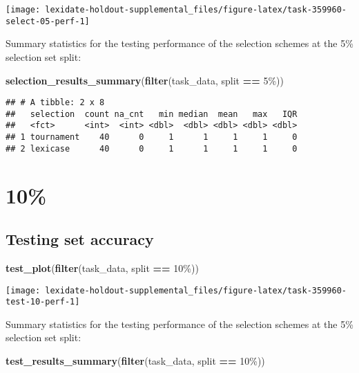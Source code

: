 \documentclass[
]{book}
\newenvironment{Shaded}{\begin{snugshade}}{\end{snugshade}}
\newcommand{\FunctionTok}[1]{\textcolor[rgb]{0.13,0.29,0.53}{\textbf{#1}}}
\newcommand{\NormalTok}[1]{#1}
\newcommand{\SpecialCharTok}[1]{\textcolor[rgb]{0.81,0.36,0.00}{\textbf{#1}}}
\newcommand{\StringTok}[1]{\textcolor[rgb]{0.31,0.60,0.02}{#1}}
\begin{document}
\texttt{[image: lexidate-holdout-supplemental\_files/figure-latex/task-359960-select-05-perf-1]}

Summary statistics for the testing performance of the selection schemes at the 5\% selection set split:

\begin{Shaded}
\begin{Highlighting}[]
\FunctionTok{selection\_results\_summary}\NormalTok{(}\FunctionTok{filter}\NormalTok{(task\_data, split }\SpecialCharTok{==} \StringTok{\textquotesingle{}5\%\textquotesingle{}}\NormalTok{))}
\end{Highlighting}
\end{Shaded}

\begin{verbatim}
## # A tibble: 2 x 8
##   selection  count na_cnt   min median  mean   max   IQR
##   <fct>      <int>  <int> <dbl>  <dbl> <dbl> <dbl> <dbl>
## 1 tournament    40      0     1      1     1     1     0
## 2 lexicase      40      0     1      1     1     1     0
\end{verbatim}

\hypertarget{section-46}{%
\section{10\%}\label{section-46}}

\hypertarget{testing-set-accuracy-46}{%
\subsection{Testing set accuracy}\label{testing-set-accuracy-46}}

\begin{Shaded}
\begin{Highlighting}[]
\FunctionTok{test\_plot}\NormalTok{(}\FunctionTok{filter}\NormalTok{(task\_data, split }\SpecialCharTok{==} \StringTok{\textquotesingle{}10\%\textquotesingle{}}\NormalTok{))}
\end{Highlighting}
\end{Shaded}

\texttt{[image: lexidate-holdout-supplemental\_files/figure-latex/task-359960-test-10-perf-1]}

Summary statistics for the testing performance of the selection schemes at the 5\% selection set split:

\begin{Shaded}
\begin{Highlighting}[]
\FunctionTok{test\_results\_summary}\NormalTok{(}\FunctionTok{filter}\NormalTok{(task\_data, split }\SpecialCharTok{==} \StringTok{\textquotesingle{}10\%\textquotesingle{}}\NormalTok{))}
\end{Highlighting}
\end{Shaded}
\end{document}
